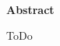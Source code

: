
~

\vspace{17.1mm}

\begin{flushleft}
    \textbf{\huge{}Abstract}{\huge\par}
\par\end{flushleft}

ToDo
